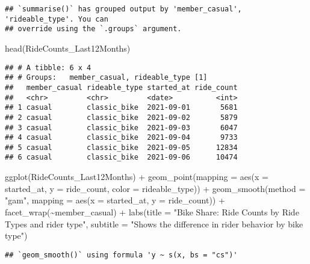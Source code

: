 \documentclass[
]{article}
\newenvironment{Shaded}{\begin{snugshade}}{\end{snugshade}}
\newcommand{\AttributeTok}[1]{\textcolor[rgb]{0.77,0.63,0.00}{#1}}
\newcommand{\FunctionTok}[1]{\textcolor[rgb]{0.00,0.00,0.00}{#1}}
\newcommand{\NormalTok}[1]{#1}
\newcommand{\SpecialCharTok}[1]{\textcolor[rgb]{0.00,0.00,0.00}{#1}}
\newcommand{\StringTok}[1]{\textcolor[rgb]{0.31,0.60,0.02}{#1}}
\begin{document}
\begin{verbatim}
## `summarise()` has grouped output by 'member_casual', 'rideable_type'. You can
## override using the `.groups` argument.
\end{verbatim}

\begin{Shaded}
\begin{Highlighting}[]
\FunctionTok{head}\NormalTok{(RideCounts\_Last12Months)}
\end{Highlighting}
\end{Shaded}

\begin{verbatim}
## # A tibble: 6 x 4
## # Groups:   member_casual, rideable_type [1]
##   member_casual rideable_type started_at ride_count
##   <chr>         <chr>         <date>          <int>
## 1 casual        classic_bike  2021-09-01       5681
## 2 casual        classic_bike  2021-09-02       5879
## 3 casual        classic_bike  2021-09-03       6047
## 4 casual        classic_bike  2021-09-04       9733
## 5 casual        classic_bike  2021-09-05      12834
## 6 casual        classic_bike  2021-09-06      10474
\end{verbatim}

\begin{Shaded}
\begin{Highlighting}[]
\FunctionTok{ggplot}\NormalTok{(RideCounts\_Last12Months) }\SpecialCharTok{+} \FunctionTok{geom\_point}\NormalTok{(}\AttributeTok{mapping =} \FunctionTok{aes}\NormalTok{(}\AttributeTok{x =}\NormalTok{ started\_at, }\AttributeTok{y =}\NormalTok{ ride\_count, }\AttributeTok{color =}\NormalTok{ rideable\_type)) }\SpecialCharTok{+} \FunctionTok{geom\_smooth}\NormalTok{(}\AttributeTok{method =} \StringTok{"gam"}\NormalTok{, }\AttributeTok{mapping =} \FunctionTok{aes}\NormalTok{(}\AttributeTok{x =}\NormalTok{ started\_at, }\AttributeTok{y =}\NormalTok{ ride\_count)) }\SpecialCharTok{+} \FunctionTok{facet\_wrap}\NormalTok{(}\SpecialCharTok{\textasciitilde{}}\NormalTok{member\_casual) }\SpecialCharTok{+} \FunctionTok{labs}\NormalTok{(}\AttributeTok{title =} \StringTok{"Bike Share: Ride Counts by Ride Types and rider type"}\NormalTok{, }\AttributeTok{subtitle =} \StringTok{"Shows the difference in rider behavior by bike type"}\NormalTok{)}
\end{Highlighting}
\end{Shaded}

\begin{verbatim}
## `geom_smooth()` using formula 'y ~ s(x, bs = "cs")'
\end{verbatim}
\end{document}
